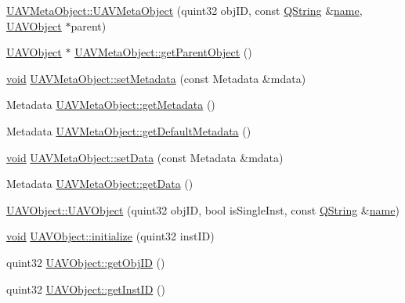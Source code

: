 \begin{DoxyCompactItemize}
\item 
\hyperlink{group___u_a_v_objects_plugin_ga82e8ae42383522ae0507b881d11abba5}{U\-A\-V\-Meta\-Object\-::\-U\-A\-V\-Meta\-Object} (quint32 obj\-I\-D, const \hyperlink{group___u_a_v_objects_plugin_gab9d252f49c333c94a72f97ce3105a32d}{Q\-String} \&\hyperlink{glext_8h_ad977737dfc9a274a62741b9500c49a32}{name}, \hyperlink{class_u_a_v_object}{U\-A\-V\-Object} $\ast$parent)
\item 
\hyperlink{class_u_a_v_object}{U\-A\-V\-Object} $\ast$ \hyperlink{group___u_a_v_objects_plugin_gabfdc167657f1b0eae61e412313785e7b}{U\-A\-V\-Meta\-Object\-::get\-Parent\-Object} ()
\item 
\hyperlink{group___u_a_v_objects_plugin_ga444cf2ff3f0ecbe028adce838d373f5c}{void} \hyperlink{group___u_a_v_objects_plugin_ga714e256632f9fbd0aba5c6a9aaae422a}{U\-A\-V\-Meta\-Object\-::set\-Metadata} (const Metadata \&mdata)
\item 
Metadata \hyperlink{group___u_a_v_objects_plugin_ga3830028095cc0fceed15e72baae231d9}{U\-A\-V\-Meta\-Object\-::get\-Metadata} ()
\item 
Metadata \hyperlink{group___u_a_v_objects_plugin_ga151811823619af6a7231118c8e64f843}{U\-A\-V\-Meta\-Object\-::get\-Default\-Metadata} ()
\item 
\hyperlink{group___u_a_v_objects_plugin_ga444cf2ff3f0ecbe028adce838d373f5c}{void} \hyperlink{group___u_a_v_objects_plugin_ga442400ff0a37c73b50d6e5ad9533ace4}{U\-A\-V\-Meta\-Object\-::set\-Data} (const Metadata \&mdata)
\item 
Metadata \hyperlink{group___u_a_v_objects_plugin_gaa60fd952fa89a624b43ba3dcf4a7c953}{U\-A\-V\-Meta\-Object\-::get\-Data} ()
\item 
\hyperlink{group___u_a_v_objects_plugin_gafee3b68612b44afbe6dd82f663126f09}{U\-A\-V\-Object\-::\-U\-A\-V\-Object} (quint32 obj\-I\-D, bool is\-Single\-Inst, const \hyperlink{group___u_a_v_objects_plugin_gab9d252f49c333c94a72f97ce3105a32d}{Q\-String} \&\hyperlink{glext_8h_ad977737dfc9a274a62741b9500c49a32}{name})
\item 
\hyperlink{group___u_a_v_objects_plugin_ga444cf2ff3f0ecbe028adce838d373f5c}{void} \hyperlink{group___u_a_v_objects_plugin_ga1ed2d21fdcea1cc31ebc6c669ba49720}{U\-A\-V\-Object\-::initialize} (quint32 inst\-I\-D)
\item 
quint32 \hyperlink{group___u_a_v_objects_plugin_gaad45ab83a511083bfe60df0c244e9b88}{U\-A\-V\-Object\-::get\-Obj\-I\-D} ()
\item 
quint32 \hyperlink{group___u_a_v_objects_plugin_gaf465e2bde7a1e41ba94c19eac2ba9b80}{U\-A\-V\-Object\-::get\-Inst\-I\-D} ()

\end{DoxyCompactItemize}
